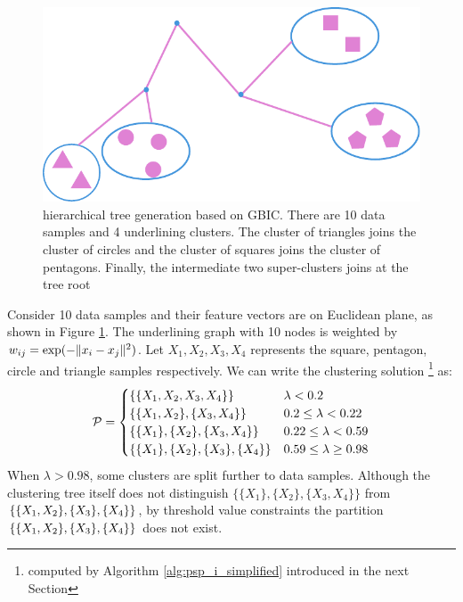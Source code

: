 \begin{example}
\begin{figure}
	\centering
	\includegraphics[width=\textwidth]{GBIC.pdf}
	\caption{hierarchical tree generation based on GBIC. There are 10 data samples and 4 underlining clusters. The cluster of triangles joins the cluster of circles and the cluster of squares joins the cluster of pentagons. Finally, the intermediate two super-clusters joins at the tree root}\label{fig:ta}
\end{figure}
Consider 10 data samples and their feature vectors are on Euclidean plane, as shown in Figure \ref{fig:ta}. The underlining graph with 10 nodes is weighted  by $w_{ij} = \exp(-\norm{x_i - x_j}^2)$. Let $X_1, X_2, X_3, X_4$ represents the square, pentagon, circle and triangle samples respectively. We can write the clustering solution \footnote{computed by Algorithm \ref{alg:psp_i_simplified} introduced in the next Section} as:
\begin{equation*}
\P = 
\begin{cases}
\{\{X_1,X_2,X_3,X_4\}\} & \lambda < 0.2 \\
\{\{X_1,X_2\},\{X_3,X_4\}\} & 0.2 \leq \lambda < 0.22 \\
\{\{X_1\},\{X_2\},\{X_3,X_4\}\} & 0.22 \leq \lambda < 0.59\\
\{\{X_1\},\{X_2\},\{X_3\},\{X_4\}\} & 0.59 \leq \lambda \geq 0.98
\end{cases}
\end{equation*}
When $\lambda > 0.98$, some clusters are split further to data samples.
Although the clustering tree itself does not distinguish
$\{\{X_1\},\{X_2\},\{X_3,X_4\}\}$ from $\{\{X_1,X_2\},\linebreak[2] \{X_3\}, \{X_4\}\}$,
by threshold value constraints the partition $\{\{X_1,X_2\} \linebreak[2] ,\{X_3\}, \{X_4\}\}$ does not exist.
\end{example}

